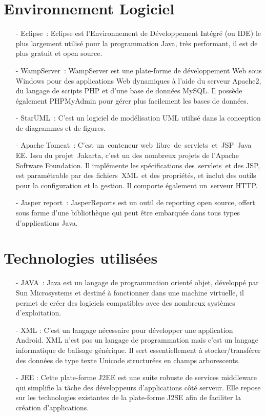 \documentclass[11.5pt]{report}
\begin{document}
\section{Environnement Logiciel }
\begin{itemize}
	\item [-] Eclipse : Eclipse est l’Environnement de Développement Intégré (ou IDE) le plus largement utilisé pour la programmation Java, très performant, il est de plus gratuit et open source.
	\item [-] WampServer : WampServer est une plate-forme de développement Web sous Windows pour des applications Web dynamiques à l’aide du serveur Apache2, du langage de scripts PHP et d’une base de données MySQL. Il possède également PHPMyAdmin pour gérer plus facilement les bases de données.
	\item [-] StarUML : C’est un logiciel de modélisation UML utilisé dans la conception de diagrammes et de figures.
	\item [-] Apache Tomcat : C’est un conteneur web libre de servlets et JSP Java EE. Issu du projet Jakarta, c'est un des nombreux projets de l’Apache Software Foundation. Il implémente les spécifications des servlets et des JSP, est paramétrable par des fichiers XML et des propriétés, et inclut des outils pour la configuration et la gestion. Il comporte également un serveur HTTP.
	\item [-] Jasper report : JasperReports est un outil de reporting open source, offert sous forme d'une bibliothèque qui peut être embarquée dans tous types d'applications Java.
\end{itemize}
\section{Technologies utilisées }
\begin{itemize}
	\item [-] JAVA : Java est un langage de programmation orienté objet, développé par Sun Microsystems et destiné à fonctionner dans une machine virtuelle, il permet de créer des logiciels compatibles avec des nombreux systèmes d’exploitation.
	\item [-] XML : C’est un langage nécessaire pour développer une application Android. XML n’est pas un langage de programmation mais c’est un langage informatique de balisage générique. Il sert essentiellement à stocker/transférer des données de type texte Unicode structurées en champs arborescents.
	\item [-] JEE : Cette plate-forme J2EE est une suite robuste de services middleware qui simplifie la tâche des développeurs d’applications côté serveur. Elle repose sur les technologies existantes de la plate-forme J2SE afin de faciliter la création d’applications.

\end{itemize}
\end{document}
